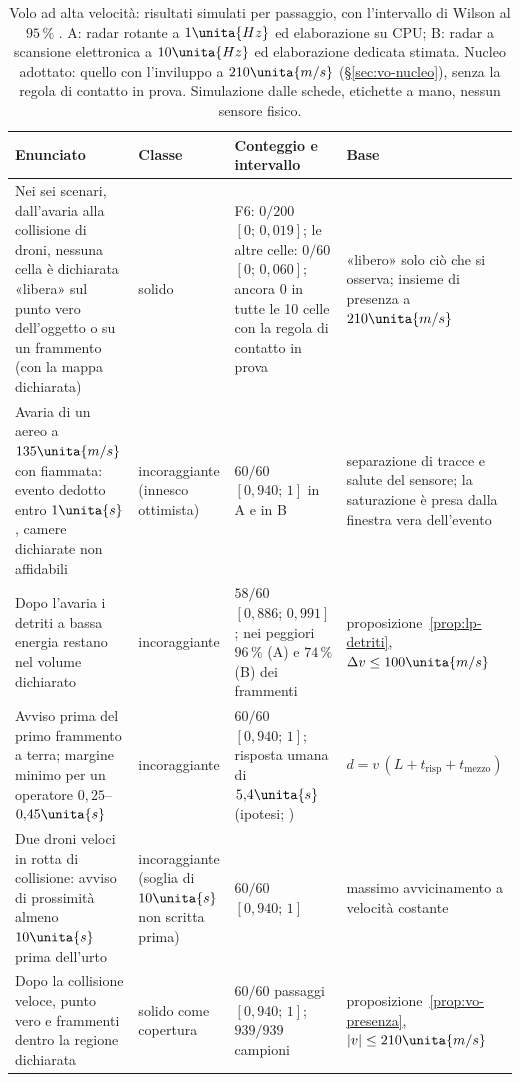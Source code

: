 \begin{table}[H]\centering\footnotesize
\caption{Volo ad alta velocità: risultati simulati per passaggio, con l'intervallo di Wilson al $95\,\%$ . A: radar rotante a $1\unita{Hz}$ ed elaborazione su CPU; B: radar a scansione elettronica a $10\unita{Hz}$ ed elaborazione dedicata stimata. Nucleo adottato: quello con l'inviluppo a $210\unita{m/s}$ (\S\ref{sec:vo-nucleo}), senza la regola di contatto in prova. Simulazione dalle schede, etichette a mano, nessun sensore fisico.}\label{tab:vo-risultati}
\begin{tabularx}{\linewidth}{@{}>{\RaggedRight\arraybackslash}p{5.0cm}>{\RaggedRight\arraybackslash}p{2.1cm}>{\RaggedRight\arraybackslash}p{4.4cm}L@{}}
\toprule
Enunciato & Classe & Conteggio e intervallo & Base\\
\midrule
Nei sei scenari, dall'avaria alla collisione di droni, nessuna cella è dichiarata «libera» sul punto vero dell'oggetto o su un frammento (con la mappa dichiarata) & solido & F6: $0/200$ $[0;\,0{,}019]$; le altre celle: $0/60$ $[0;\,0{,}060]$; ancora 0 in tutte le 10 celle con la regola di contatto in prova & «libero» solo ciò che si osserva; insieme di presenza a $210\unita{m/s}$\\
Avaria di un aereo a $135\unita{m/s}$ con fiammata: evento dedotto entro $1\unita{s}$, camere dichiarate non affidabili & incoraggiante (innesco ottimista) & $60/60$ $[0{,}940;\,1]$ in A e in B & separazione di tracce e salute del sensore; la saturazione è presa dalla finestra vera dell'evento\\
Dopo l'avaria i detriti a bassa energia restano nel volume dichiarato & incoraggiante & $58/60$ $[0{,}886;\,0{,}991]$; nei peggiori $96\,\%$ (A) e $74\,\%$ (B) dei frammenti & proposizione~\ref{prop:lp-detriti}, $\Delta v\le100\unita{m/s}$\\
Avviso prima del primo frammento a terra; margine minimo per un operatore $0{,}25$--$0{,}45\unita{s}$ & incoraggiante & $60/60$ $[0{,}940;\,1]$; risposta umana di $5{,}4\unita{s}$ (ipotesi; \cite{faa-ac-90-48e}) & $d=v\,(L+t_{\mathrm{risp}}+t_{\mathrm{mezzo}})$\\
Due droni veloci in rotta di collisione: avviso di prossimità almeno $10\unita{s}$ prima dell'urto & incoraggiante (soglia di $10\unita{s}$ non scritta prima) & $60/60$ $[0{,}940;\,1]$ & massimo avvicinamento a velocità costante\\
Dopo la collisione veloce, punto vero e frammenti dentro la regione dichiarata & solido come copertura & $60/60$ passaggi $[0{,}940;\,1]$; $939/939$ campioni & proposizione~\ref{prop:vo-presenza}, $|v|\le210\unita{m/s}$\\

\end{tabularx}
\end{table}
